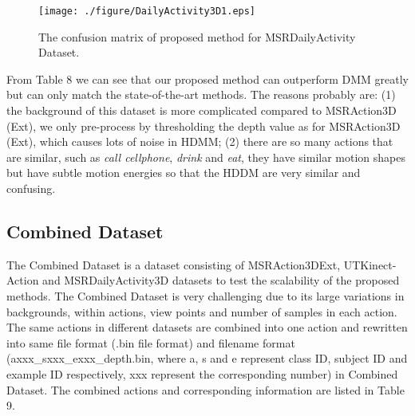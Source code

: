 \documentclass[conference]{IEEEtran}
\begin{document}
\begin{figure}[!ht]
\begin{center}{\texttt{[image: ./figure/DailyActivity3D1.eps]}}
\end{center}
\caption{The confusion matrix of proposed method for MSRDailyActivity Dataset.}
\label{fig:framework}
\end{figure}

From Table 8 we can see that our proposed method can outperform DMM \cite{Yang2012a} greatly but can only match the state-of-the-art methods. The reasons probably are: (1) the background of this dataset is more complicated compared to MSRAction3D (Ext), we only pre-process by thresholding the depth value as for MSRAction3D (Ext), which causes lots of noise in HDMM; (2) there are so many actions that are similar, such as \textit{call cellphone}, \textit{drink} and \textit{eat}, they have similar motion shapes but have subtle motion energies so that the HDDM are very similar and confusing.

\subsection{Combined Dataset}
The Combined Dataset is a dataset consisting of MSRAction3DExt, UTKinect-Action and MSRDailyActivity3D datasets to test the scalability of the proposed methods. The Combined Dataset is very challenging due to its large variations in backgrounds, within actions, view points and number of samples in each action. The same actions in different datasets are combined into one action and rewritten into same file format (.bin file format) and filename format (axxx\_sxxx\_exxx\_depth.bin, where a, s and e represent class ID, subject ID and example ID respectively, xxx represent the corresponding number) in Combined Dataset. The combined actions and corresponding information are listed in Table 9.
\end{document}
